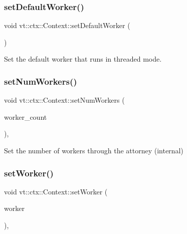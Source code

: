\subsubsection{\texorpdfstring{set\+Default\+Worker()}{setDefaultWorker()}}
{\footnotesize\ttfamily void vt\+::ctx\+::\+Context\+::set\+Default\+Worker (\begin{DoxyParamCaption}{ }\end{DoxyParamCaption})\hspace{0.3cm}{\ttfamily [private]}}



Set the default worker that runs in threaded mode. 

\mbox{\label{structvt_1_1ctx_1_1_context_afc4549ac9cdae67301613613b9381d1c}} 
\subsubsection{\texorpdfstring{set\+Num\+Workers()}{setNumWorkers()}}
{\footnotesize\ttfamily void vt\+::ctx\+::\+Context\+::set\+Num\+Workers (\begin{DoxyParamCaption}\item[{\hyperlink{namespacevt_aa93398ea48f2cb6c188512250f7cc248}{Worker\+Count\+Type} const}]{worker\+\_\+count }\end{DoxyParamCaption})\hspace{0.3cm}{\ttfamily [inline]}, {\ttfamily [protected]}}



Set the number of workers through the attorney (internal) 

\mbox{\label{structvt_1_1ctx_1_1_context_a32f62f26b7a6977c91186f8c2aa2b16a}} 
\subsubsection{\texorpdfstring{set\+Worker()}{setWorker()}}
{\footnotesize\ttfamily void vt\+::ctx\+::\+Context\+::set\+Worker (\begin{DoxyParamCaption}\item[{\hyperlink{namespacevt_a656e362091da17b9b93d0655b36e3392}{Worker\+I\+D\+Type} const}]{worker }\end{DoxyParamCaption})\hspace{0.3cm}{\ttfamily [inline]}, {\ttfamily [protected]}}



